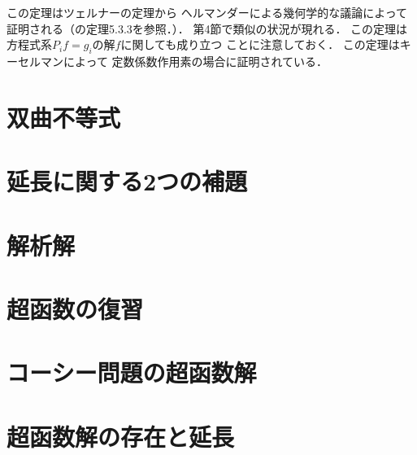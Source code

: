\begin{RMK*}
    この定理はツェルナー\cite{15}の定理から
    ヘルマンダーによる幾何学的な議論によって
    証明される（\cite{5}の定理5.3.3を参照．）．
    第4節で類似の状況が現れる．
    この定理は方程式系\(P_if=g_i\)の解\(f\)に関しても成り立つ
    ことに注意しておく．
    この定理はキーセルマン\cite{8}によって
    定数係数作用素の場合に証明されている．
\end{RMK*}

\section{双曲不等式}

\section{延長に関する2つの補題}

\section{解析解}

\section{超函数の復習}

\section{コーシー問題の超函数解}

\section{超函数解の存在と延長}

